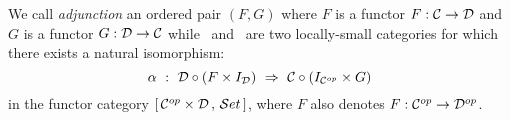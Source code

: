 \begin{defin}\label{Adj:def:adjunction}
    We call {\em adjunction} an ordered pair $(F,G)$ where $F$ is a functor
    $F:\mbox{$\cal C$}\to\mbox{$\cal D$}$ and $G$ is a functor $G:\mbox{$\cal D$}\to\mbox{$\cal C$}$ while \Cat\  and 
    \Dat\ are two locally-small categories for which there exists a natural 
    isomorphism: 
        \[
            \alpha\ :\ 
            \Dat\circ(F\times I_{\cal D})
            \ \Rightarrow\ 
            \Cat\circ(I_{{\cal C}^{op}}\times G)
        \]
    in the functor category $[\,\mbox{${\cal C}^{op}$}\times\mbox{$\cal D$}\, ,\,\mbox{${\cal S}et$}\,]$,
    where $F$ also denotes $F:\mbox{${\cal C}^{op}$}\rightarrow\mbox{${\cal D}^{op}$}$.
\end{defin}
